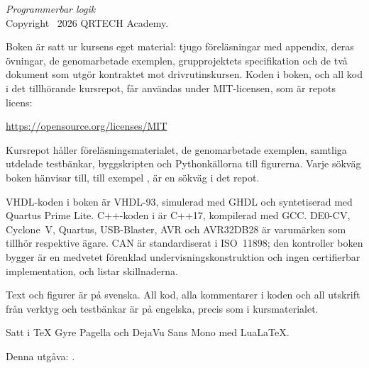 \thispagestyle{empty}
\vspace*{\fill}
{\small
\noindent\textit{Programmerbar logik}\\
Copyright \textcopyright\ 2026 QRTECH Academy.

\medskip
\noindent Boken är satt ur kursens eget material: tjugo föreläsningar med appendix, deras övningar,
de genomarbetade exemplen, grupprojektets specifikation och de två dokument som utgör kontraktet
mot drivrutinskursen. Koden i boken, och all kod i det tillhörande kursrepot, får användas under
MIT-licensen, som är repots licens:

\medskip
\noindent\url{https://opensource.org/licenses/MIT}

\medskip
\noindent Kursrepot håller föreläsningsmaterialet, de genomarbetade exemplen, samtliga utdelade
testbänkar, byggskripten och Python\-källorna till figurerna. Varje sökväg boken hänvisar till,
till exempel , är en sökväg i det repot.

\medskip
\noindent VHDL-koden i boken är VHDL-93, simulerad med GHDL och syntetiserad med Quartus Prime
Lite. C++-koden i  är C++17, kompilerad med GCC. DE0-CV, Cyclone~V,
Quartus, USB-Blaster, AVR och AVR32DB28 är varumärken som tillhör respektive ägare. CAN är
standardiserat i ISO~11898; den kontroller boken bygger är en medvetet förenklad
undervisningskonstruktion och ingen certifierbar implementation, och 
listar skillnaderna.

\medskip
\noindent Text och figurer är på svenska. All kod, alla kommentarer i koden och all utskrift från
verktyg och testbänkar är på engelska, precis som i kursmaterialet.

\medskip
\noindent Satt i TeX Gyre Pagella och DejaVu Sans Mono med Lua\LaTeX.

\medskip
\noindent\textcolor{muted}{Denna utgåva: \bookedition.}
\par}
\cleardoublepage
